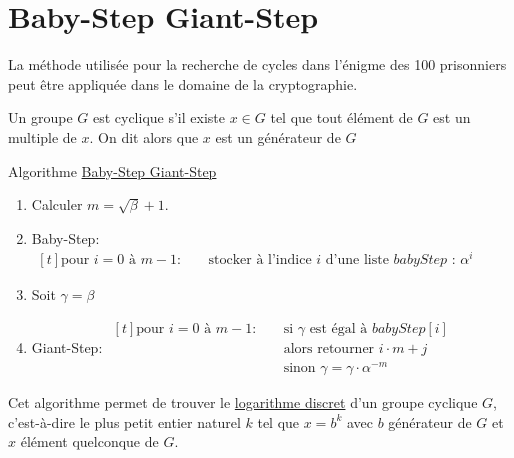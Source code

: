 \section{Baby-Step Giant-Step}

La méthode utilisée pour la recherche de cycles dans l'énigme des 100 prisonniers peut
être appliquée dans le domaine de la cryptographie.

\begin{tcolorbox}
    Un groupe $G$ est cyclique s'il existe $x \in G$ 
    tel que tout élément de $G$ est un multiple de $x$.
    On dit alors que $x$ est un générateur de $G$ 
\end{tcolorbox}


\begin{algorithm}[H]
    \caption{Algorithme \href{https://fr.wikipedia.org/wiki/Baby-step_giant-step}{Baby-Step Giant-Step}}
        \begin{enumerate}
            \item Calculer $m = \sqrt{\beta} +1$.
            \item Baby-Step:
                $\begin{aligned}[t]
                    \text{pour } i = 0 \text{ à } m-1: \quad & \text{stocker à l'indice $i$ d'une liste $babyStep$ : } \alpha^i
                \end{aligned}$
            \item Soit $\gamma = \beta$
            \item Giant-Step:
                $\begin{aligned}[t]
                    \text{pour } i = 0 \text{ à } m-1: \quad & \text{si } \gamma \text{ est égal à } babyStep[i] \\
                                                                & \text{alors retourner } i \cdot m + j \\
                                                                & \text{sinon } \gamma = \gamma \cdot \alpha^{-m}
                \end{aligned}$
        \end{enumerate}
    \end{algorithm}

Cet algorithme permet de trouver le \href{https://fr.wikipedia.org/wiki/Logarithme_discret}{logarithme discret} d'un groupe cyclique $G$,
c'est-à-dire le plus petit entier naturel $k$ tel que $x = b^k$ avec $b$ générateur de $G$
et $x$ élément quelconque de $G$.

